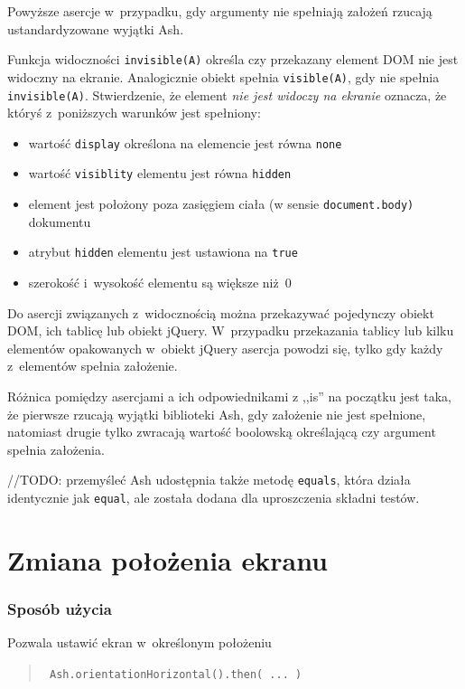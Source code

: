 \documentclass[brudnopis]{xmgr}
\begin{document}
Powyższe asercje w~przypadku, gdy argumenty nie spełniają założeń rzucają ustandardyzowane wyjątki Ash. 

Funkcja widoczności \texttt{invisible(A)} określa czy przekazany element DOM nie jest widoczny na ekranie. Analogicznie obiekt spełnia \texttt{visible(A)}, gdy nie spełnia \texttt{invisible(A)}. Stwierdzenie, że element {\it nie jest widoczy na ekranie} oznacza, że któryś z~poniższych warunków jest spełniony:

\begin{itemize}
  \item wartość \texttt{display} określona na elemencie jest równa \texttt{none}
  \item wartość \texttt{visiblity} elementu jest równa \texttt{hidden}
  \item element jest położony poza zasięgiem ciała (w sensie \texttt{document.body)} dokumentu
  \item atrybut \texttt{hidden} elementu jest ustawiona na \texttt{true}
  \item szerokość i~wysokość elementu są większe niż~0
\end{itemize}

Do asercji związanych z~widocznością można przekazywać pojedynczy obiekt DOM, ich tablicę lub obiekt jQuery. W~przypadku przekazania tablicy lub kilku elementów opakowanych w~obiekt jQuery asercja powodzi się, tylko gdy każdy z~elementów spełnia założenie. 

Różnica pomiędzy asercjami a ich odpowiednikami z ,,is'' na początku jest taka, że pierwsze rzucają wyjątki biblioteki Ash, gdy założenie nie jest spełnione, natomiast drugie tylko zwracają wartość boolowską określającą czy argument spełnia założenia.  

//TODO: przemyśleć
Ash udostępnia także metodę \texttt{equals}, która działa identycznie jak \texttt{equal}, ale została dodana dla uproszczenia składni testów.

\section{Zmiana położenia ekranu}

\subsubsection{Sposób użycia}
Pozwala ustawić ekran w~określonym położeniu

\begin{quote}
  \texttt{  Ash.orientationHorizontal().then( ... )  }
\end{quote}
\end{document}
